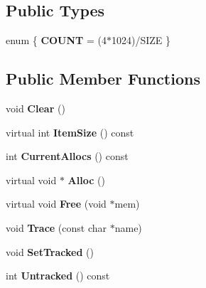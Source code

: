\subsection*{Public Types}
\begin{DoxyCompactItemize}
\item 
\hypertarget{classtinyxml2_1_1_mem_pool_t_a04cf45156e6f913f93972869ff8a1d94}{}enum \{ {\bfseries C\+O\+U\+N\+T} = (4$\ast$1024)/\+S\+I\+Z\+E
 \}\label{classtinyxml2_1_1_mem_pool_t_a04cf45156e6f913f93972869ff8a1d94}

\end{DoxyCompactItemize}
\subsection*{Public Member Functions}
\begin{DoxyCompactItemize}
\item 
\hypertarget{classtinyxml2_1_1_mem_pool_t_a469d55e82be97d5ffeff82dd001a7029}{}void {\bfseries Clear} ()\label{classtinyxml2_1_1_mem_pool_t_a469d55e82be97d5ffeff82dd001a7029}

\item 
\hypertarget{classtinyxml2_1_1_mem_pool_t_a7ec8778fe99f6e332615a703be0b48bc}{}virtual int {\bfseries Item\+Size} () const \label{classtinyxml2_1_1_mem_pool_t_a7ec8778fe99f6e332615a703be0b48bc}

\item 
\hypertarget{classtinyxml2_1_1_mem_pool_t_a56be11b7db6a7ef00db17088a7769aab}{}int {\bfseries Current\+Allocs} () const \label{classtinyxml2_1_1_mem_pool_t_a56be11b7db6a7ef00db17088a7769aab}

\item 
\hypertarget{classtinyxml2_1_1_mem_pool_t_aa9d785a48ffe6ea1be679bab13464486}{}virtual void $\ast$ {\bfseries Alloc} ()\label{classtinyxml2_1_1_mem_pool_t_aa9d785a48ffe6ea1be679bab13464486}

\item 
\hypertarget{classtinyxml2_1_1_mem_pool_t_a4f1a0c434e9e3d7391e5c16ed4ee8c70}{}virtual void {\bfseries Free} (void $\ast$mem)\label{classtinyxml2_1_1_mem_pool_t_a4f1a0c434e9e3d7391e5c16ed4ee8c70}

\item 
\hypertarget{classtinyxml2_1_1_mem_pool_t_a0bc596f271e0f139822c534238b3f244}{}void {\bfseries Trace} (const char $\ast$name)\label{classtinyxml2_1_1_mem_pool_t_a0bc596f271e0f139822c534238b3f244}

\item 
\hypertarget{classtinyxml2_1_1_mem_pool_t_a7798932414916199a1bc0f9c3f368521}{}void {\bfseries Set\+Tracked} ()\label{classtinyxml2_1_1_mem_pool_t_a7798932414916199a1bc0f9c3f368521}

\item 
\hypertarget{classtinyxml2_1_1_mem_pool_t_a524b90d0edeac41964c06510757dce0f}{}int {\bfseries Untracked} () const \label{classtinyxml2_1_1_mem_pool_t_a524b90d0edeac41964c06510757dce0f}

\end{DoxyCompactItemize}
